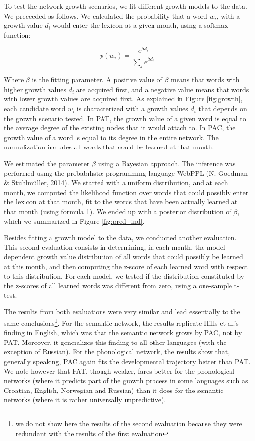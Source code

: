 \documentclass[10pt, letterpaper]{article}
\begin{document}
To test the network growth scenarios, we fit different growth models to
the data. We proceeded as follows. We calculated the probability that a
word \(w_i\), with a growth value \(d_i\) would enter the lexicon at a
given month, using a softmax function:

\begin{equation}
 p(w_i)= \frac{e^{\beta d_i}}{\sum_j e^{\beta d_j} }
\end{equation}

Where \(\beta\) is the fitting parameter. A positive value of \(\beta\)
means that words with higher growth values \(d_i\) are acquired first,
and a negative value means that words with lower growth values are
acquired first. As explained in Figure \ref{fig:growth}, each candidate
word \(w_i\) is characterized with a growth values \(d_i\) that depends
on the growth scenario tested. In PAT, the growth value of a given word
is equal to the average degree of the existing nodes that it would
attach to. In PAC, the growth value of a word is equal to its degree in
the entire network. The normalization includes all words that could be
learned at that month.

We estimated the parameter \(\beta\) using a Bayesian approach. The
inference was performed using the probabilistic programming language
WebPPL (N. Goodman \& Stuhlmüller, 2014). We started with a uniform
distribution, and at each month, we computed the likelihood function
over words that could possibly enter the lexicon at that month, fit to
the words that have been actually learned at that month (using formula
1). We ended up with a posterior distribution of \(\beta\), which we
summarized in Figure \ref{fig:pred_ind}.

Besides fitting a growth model to the data, we conducted another
evaluation. This second evaluation consists in determining, in each
month, the model-dependent growth value distribution of all words that
could possibly be learned at this month, and then computing the z-score
of each learned word with respect to this distribution. For each model,
we tested if the distribution constituted by the z-scores of all learned
words was different from zero, using a one-sample t-test.

The results from both evaluations were very similar and lead essentially
to the same
conclusions\footnote{we do not show here the results of the second evaluation because they were redundant with the results of the first evaluation}.
For the semantic network, the results replicate Hills et al.'s finding
in English, which was that the semantic network grows by PAC, not by
PAT. Moreover, it generalizes this finding to all other languages (with
the exception of Russian). For the phonological network, the results
show that, generally speaking, PAC again fits the developmental
trajectory better than PAT. We note however that PAT, though weaker,
fares better for the phonological networks (where it predicts part of
the growth process in some languages such as Croatian, English,
Norwegian and Russian) than it does for the semantic networks (where it
is rather universally unpredictive).
\end{document}
